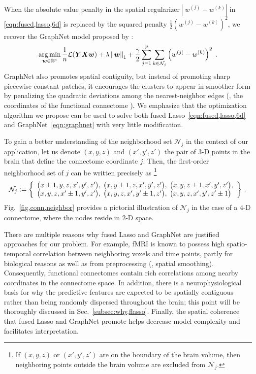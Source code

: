 When the absolute value penalty in the spatial regularizer ${|\,w^{(j)}-w^{(k)}|}$ in \eqref{eqn:fused,lasso,6d} is replaced by the squared penalty $\frac{1}{2}(w^{(j)}-w^{(k)})^2$, we recover the GraphNet model proposed by \mbox{\cite{Grosenick:2013}}:
\begin{equation}
	\operatorname*{arg\,min}_{{\bm{w}}\in\mathbb{R}^p}\frac{1}{n}\mathcal{L}({\bm{YXw}}) + \lambda\left\| \bm{w} \right\|_1 + 
		\frac{\gamma}{2}\sum_{j=1}^p\sum_{k\in\mathcal{N}_j} \left(w^{(j)}-w^{(k)}\right)^2 \;.
	\label{eqn:graphnet}
\end{equation}
GraphNet also promotes spatial contiguity, but instead of promoting sharp piecewise constant patches, it encourages the clusters to appear in smoother form by penalizing the quadratic deviations among the nearest-neighbor edges (\ie, the coordinates of the functional connectome \x).
We emphasize that the optimization algorithm we propose can be used to solve both fused Lasso~\eqref{eqn:fused,lasso,6d} and GraphNet~\eqref{eqn:graphnet} with very little modification.

To gain a better understanding of the neighborhood set $\mathcal{N}_j$ in the context of our application, let us denote $(x,y,z)$ and $(x',y',z')$ the pair of $3$-D points in the brain that define the connectome coordinate $j$.
Then, the first-order neighborhood set of $j$ can be written precisely as
\footnote{If $(x,y,z)$ or $(x',y',z')$ are on the boundary of the brain volume, then neighboring points outside the brain volume are excluded from $\mathcal{N}_j$.}
\begin{equation}
	\mathcal{N}_j:=
	\left\{
	\begin{array}{l}
			\big(x\pm 1,y,z,x',y',z'\big), \;
			\big(x,y\pm 1,z,x',y',z'\big), \;
			\big(x,y,z\pm 1,x',y',z'\big),\\
			\big(x,y,z,x'\pm 1,y',z'\big), \;
			\big(x,y,z,x',y'\pm 1,z'\big), \;
			\big(x,y,z,x',y',z'\pm 1\big)
	\end{array}\right\}\; .
	\nonumber
\end{equation}
Fig.~\ref{fig,conn,neighbor} provides a pictorial illustration of $\mathcal{N}_j$ in the case of a $4$-D connectome, where the nodes reside in $2$-D space.

There are multiple reasons why fused Lasso and GraphNet are justified approaches for our problem.
For example, fMRI is known to possess high spatio-temporal correlation between neighboring voxels and time points, partly for biological reasons as well as from preprocessing (\eg, spatial smoothing).
Consequently, functional connectomes contain rich correlations among nearby coordinates in the connectome space.
In addition, there is a neurophysiological basis for why the predictive features are expected to be spatially contiguous rather than being randomly dispersed throughout the brain; this point will be  thoroughly discussed in Sec.~\ref{subsec:why,flasso}.
Finally, the spatial coherence that fused Lasso and GraphNet promote helps decrease model complexity and facilitates interpretation.

